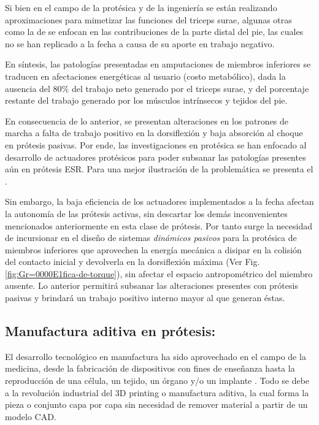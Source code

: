 \documentclass[12pt,english]{article}
\begin{document}
Si bien en el campo de la protésica y de la ingeniería se están realizando
aproximaciones para mimetizar las funciones del triceps surae, algunas
otras como la de \cite{Takahashi2013} se enfocan en las contribuciones
de la parte distal del pie, las cuales no se han replicado a la fecha
a causa de su aporte en trabajo negativo.

En síntesis, las patologías presentadas en amputaciones de miembros
inferiores se traducen en afectaciones energéticas al usuario (costo
metabólico), dada la ausencia del 80\% del trabajo neto generado por
el triceps surae, y del porcentaje restante del trabajo generado por
los músculos intrínsecos y tejidos del pie.

En consecuencia de lo anterior, se presentan alteraciones en los patrones
de marcha a falta de trabajo positivo en la dorsiflexión y baja absorción
al choque en prótesis pasivas. Por ende, las investigaciones en protésica
se han enfocado al desarrollo de actuadores protésicos para poder
subsanar las patologías presentes aún en prótesis ESR. Para una mejor
ilustración de la problemática se presenta el .

Sin embargo, la baja eficiencia de los actuadores implementados a
la fecha afectan la autonomía de las prótesis activas, sin descartar
los demás inconvenientes mencionados anteriormente en esta clase de
prótesis. Por tanto surge la necesidad de incursionar en el diseño
de sistemas \emph{dinámicos pasivos} \cite{mcgeer1990passive} para
la protésica de miembros inferiores que aprovechen la energía mecánica
a disipar en la colisión del contacto inicial y devolverla en la dorsiflexión
máxima (Ver Fig. \ref{fig:Gr=0000E1fica-de-torque}), sin
afectar el espacio antropométrico del miembro ausente. Lo anterior
permitirá subsanar las alteraciones presentes con prótesis pasivas
y brindará un trabajo positivo interno mayor al que generan éstas.


\subsection*{Manufactura aditiva en prótesis:}

El desarrollo tecnológico en manufactura ha sido aprovechado en el
campo de la medicina, desde la fabricación de dispositivos con fines
de enseñanza hasta la reproducción de una célula, un tejido, un órgano
y/o un implante \cite{Michalski2014}. Todo se debe a la revolución
industrial del 3D printing o manufactura aditiva, la cual forma la
pieza o conjunto capa por capa sin necesidad de remover material a
partir de un modelo CAD.
\end{document}
